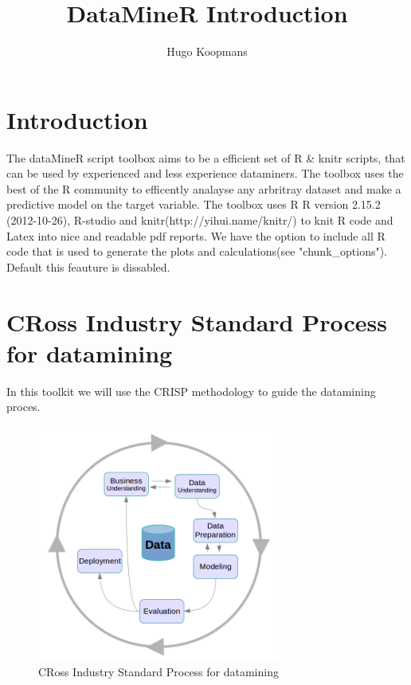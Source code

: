\documentclass[12pt,a4paper,titlepage]{report}\usepackage{graphicx, color}
\author{Hugo Koopmans}
\title{DataMineR Introduction}
\begin{document}
\maketitle
\tableofcontents
\newpage
\section{Introduction}
The dataMineR script toolbox aims to be a efficient set of R \& knitr scripts, that can be used by experienced and less experience dataminers. The toolbox uses the best of the R community to efficently analayse any arbritray dataset and make a predictive model on the target variable.
The toolbox uses R R version 2.15.2 (2012-10-26), R-studio and knitr(http://yihui.name/knitr/) to knit R code and Latex into nice and readable pdf reports. We have the option to include all R code that is used to generate the plots and calculations(see "chunk\_options"). Default this feauture is dissabled.\\
\section{CRoss Industry Standard Process for datamining}
In this toolkit we will use the CRISP methodology to guide the datamining proces.

\begin{figure}[H]
  \centering
  \includegraphics[width=8cm]{../figure/CRISP-circle.png}
  \caption{CRoss Industry Standard Process for datamining}
\end{figure}
\end{document}
